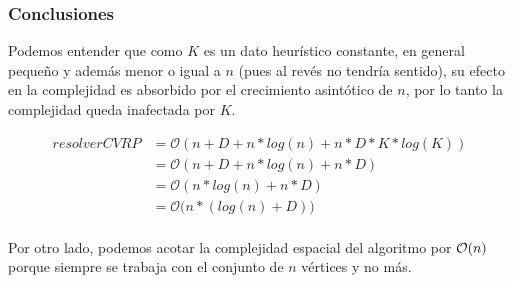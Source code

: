 \subsubsection{Conclusiones}
Podemos entender que como $K$ es un dato heurístico constante, en general pequeño y además menor o igual a $n$ (pues al revés no tendría sentido), su efecto en la complejidad es absorbido por el crecimiento asintótico de $n$, por lo tanto la complejidad queda inafectada por $K$.

\begin{align}
resolverCVRP  &= \mathcal{O}(n+D + n*log(n) + n*D*K*log(K)) \\
              &= \mathcal{O}(n+D + n*log(n) + n*D) \\
              &= \mathcal{O}(n*log(n) + n*D) \\
              &= \mathcal{O}\Big( n*(log(n) + D)\Big) \\
\end{align}

Por otro lado, podemos acotar la complejidad espacial del algoritmo por $\mathcal{O}(n)$ porque siempre se trabaja con el conjunto de $n$ vértices y no más.

